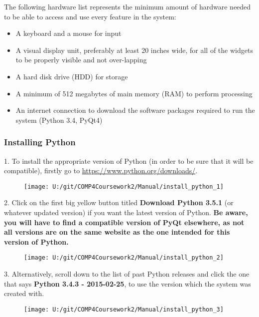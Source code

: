 The following hardware list represents the minimum amount of hardware needed to be able to access and use every feature in the system:

\begin{itemize}
	\item A keyboard and a mouse for input 
	\item A visual display unit, preferably at least 20 inches wide, for all of the widgets to be properly visible and not over-lapping
	\item A hard disk drive (HDD) for storage
	\item A minimum of 512 megabytes of main memory (RAM) to perform processing
	\item An internet connection to download the software packages required to run the system (Python 3.4, PyQt4)
\end{itemize}






\subsubsection{Installing Python}

1. To install the appropriate version of Python (in order to be sure that it will be compatible), firstly go to \url{https://www.python.org/downloads/}.

\begin{figure}[H]
    \texttt{[image: U:/git/COMP4Coursework2/Manual/install\_python\_1]}
\end{figure}

2. Click on the first big yellow button titled \textbf{Download Python 3.5.1} (or whatever updated version) if you want the latest version of Python. \textbf{Be aware, you will have to find a compatible version of PyQt elsewhere, as not all versions are on the same website as the one intended for this version of Python.}

\begin{figure}[H]
    \texttt{[image: U:/git/COMP4Coursework2/Manual/install\_python\_2]}
\end{figure}

3. Alternatively, scroll down to the list of past Python releases and click the one that says \textbf{Python 3.4.3 - 2015-02-25}, to use the version which the system was created with. 

\begin{figure}[H]
    \texttt{[image: U:/git/COMP4Coursework2/Manual/install\_python\_3]}
\end{figure}


